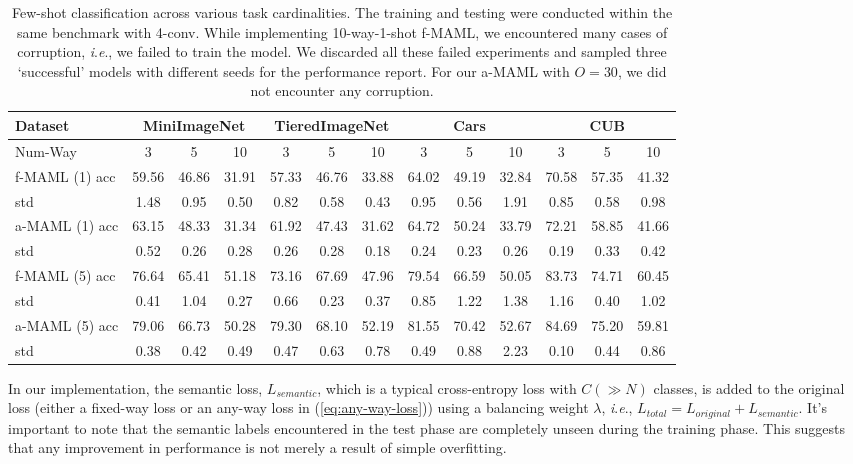 \documentclass[letterpaper]{article} %
\newcommand{\jh}[1]{\textcolor{black}{#1}}
\newcommand{\ie}{\textit{i}.\textit{e}., }
\begin{document}
\begin{table}[]
\centering
\begin{tabular}{l|ccc|ccc|ccc|ccc}
\toprule
Dataset & \multicolumn{3}{c|}{MiniImageNet} & \multicolumn{3}{c|}{TieredImageNet} & \multicolumn{3}{c|}{Cars} & \multicolumn{3}{c}{CUB} \\ 
\midrule
Num-Way & 3 & 5 & 10 & 3 & 5 & 10 & 3 & 5 & 10 & 3 & 5 & 10 \\ 
\midrule
f-MAML (1) acc& 59.56 & 46.86 & 31.91 & 57.33 & 46.76 & 33.88 & 64.02 & 49.19 & 32.84 & 70.58 & 57.35 & 41.32 \\ 
\hfill std  & 1.48 & 0.95 & 0.50 & 0.82 & 0.58 & 0.43 & 0.95 & 0.56 & 1.91 & 0.85 & 0.58 & 0.98 \\ 
\midrule
a-MAML (1) acc& 63.15 & 48.33 & 31.34 & 61.92 & 47.43 & 31.62 & 64.72 & 50.24 & 33.79 & 72.21 & 58.85 & 41.66 \\ 
\hfill std  & 0.52 & 0.26 & 0.28 & 0.26 & 0.28 & 0.18 & 0.24 & 0.23 & 0.26 & 0.19 & 0.33 & 0.42 \\
\midrule
f-MAML (5) acc & 76.64 & 65.41 & 51.18 & 73.16 & 67.69 & 47.96 & 79.54 & 66.59 & 50.05 & 83.73 & 74.71 & 60.45 \\ 
\hfill std  & 0.41 & 1.04 & 0.27 & 0.66 & 0.23 & 0.37 & 0.85 & 1.22 & 1.38 & 1.16 & 0.40 & 1.02 \\ 
\midrule
a-MAML (5) acc& 79.06 & 66.73 & 50.28 & 79.30 & 68.10 & 52.19 & 81.55 & 70.42 & 52.67 & 84.69 & 75.20 & 59.81 \\ 
\hfill std  & 0.38 & 0.42 & 0.49 & 0.47 & 0.63 & 0.78 & 0.49 & 0.88 & 2.23 & 0.10 & 0.44 & 0.86 \\
\bottomrule
\end{tabular}
\caption{Few-shot classification across various task cardinalities. The training and testing were conducted within the same benchmark with 4-conv. While implementing 10-way-1-shot f-MAML, we encountered many cases of corruption, \ie we failed to train the model. We discarded all these failed experiments and sampled three `successful' models with different seeds for the performance report. For our a-MAML with $O = 30$, we did not encounter any corruption.}
\label{table:GBML_MAIN}
\end{table}



In our implementation, the semantic loss, $L_{semantic}$, which is a typical cross-entropy loss with $C (\gg N)$ classes, is added to the original loss (either a fixed-way loss or an any-way loss in (\ref{eq:any-way-loss})) using a balancing weight $\lambda$, \ie $L_{total} = L_{original} + L_{semantic}$. It's important to note that the semantic labels encountered in the test phase are completely unseen during the training phase. This suggests that any improvement in performance is not merely a result of simple overfitting.
\end{document}
